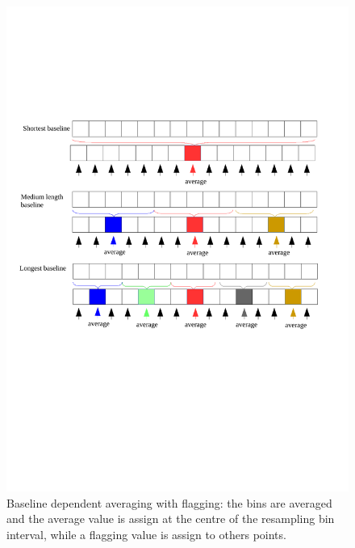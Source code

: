 \documentclass[useAMS,usenatbib]{mn2e}
\begin{document}
\begin{figure}
\includegraphics[width=\columnwidth]{./Figures/bda_averaging_senario.pdf}
\caption{Baseline dependent averaging with flagging: the bins are averaged and the average
value is assign at the centre of the resampling bin interval, while a flagging value is assign to others points.}\label{fig:bdavgflagging}
\end{figure}
\end{document}
